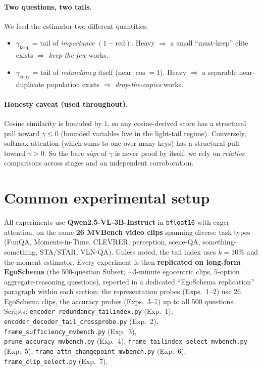 \documentclass[11pt]{article}
\newcommand{\gm}{\gamma}
\newcommand{\gkeep}{\gamma_{\mathrm{keep}}}
\newcommand{\gcopy}{\gamma_{\mathrm{copy}}}
\begin{document}
\paragraph{Two questions, two tails.}
We feed the estimator two different quantities:
\begin{itemize}
\item $\gkeep$ = tail of \emph{importance} $(1-\mathrm{red})$. Heavy $\Rightarrow$ a
      small ``must-keep'' elite exists $\Rightarrow$ \emph{keep-the-few} works.
\item $\gcopy$ = tail of \emph{redundancy} itself (near $\cos=1$). Heavy $\Rightarrow$
      a separable near-duplicate population exists $\Rightarrow$ \emph{drop-the-copies}
      works.
\end{itemize}

\paragraph{Honesty caveat (used throughout).}
Cosine similarity is bounded by $1$, so any cosine-derived score has a structural
pull toward $\gm\le0$ (bounded variables live in the light-tail regime).
Conversely, softmax attention (which sums to one over many keys) has a structural
pull toward $\gm>0$. So the bare \emph{sign} of $\gm$ is never proof by itself; we
rely on \emph{relative} comparisons across stages and on independent corroboration.

\section{Common experimental setup}

All experiments use \textbf{Qwen2.5-VL-3B-Instruct} in \texttt{bfloat16} with eager
attention, on the same \textbf{26 MVBench video clips} spanning diverse task types
(FunQA, Moments-in-Time, CLEVRER, perception, scene-QA, something-something,
STA/STAR, VLN-QA). Unless noted, the tail index uses $k{=}10\%$ and the moment
estimator. Every experiment is then \textbf{replicated on long-form EgoSchema} (the
500-question Subset; $\sim$3-minute egocentric clips, 5-option aggregate-reasoning
questions), reported in a dedicated ``EgoSchema replication'' paragraph within each
section; the representation probes (Exps.~1--2) use 26 EgoSchema clips, the accuracy
probes (Exps.~3--7) up to all 500 questions. Scripts: \texttt{encoder\_redundancy\_tailindex.py} (Exp.~1),
\texttt{encoder\_decoder\_tail\_crossprobe.py} (Exp.~2),
\texttt{frame\_sufficiency\_mvbench.py} (Exp.~3),\\
\texttt{prune\_accuracy\_mvbench.py} (Exp.~4),
\texttt{frame\_tailindex\_select\_mvbench.py} (Exp.~5),
\texttt{frame\_attn\_changepoint\_mvbench.py} (Exp.~6),
\texttt{frame\_clip\_select.py} (Exp.~7).
\end{document}
